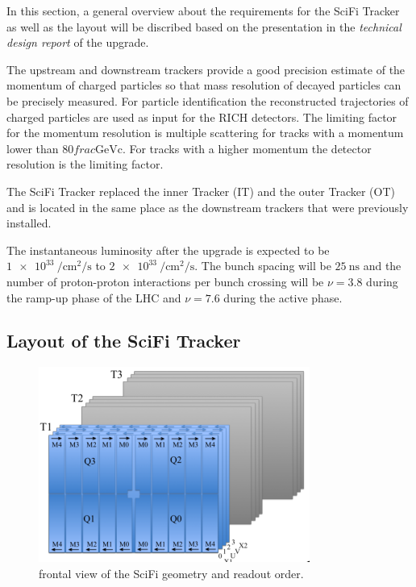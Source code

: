 In this section, a general overview about the requirements for the SciFi Tracker as well as the layout will be discribed based on the presentation in the \textit{technical design report}\cite{scifiInfo} of the upgrade.

The upstream and downstream trackers provide a good precision estimate of the momentum of charged particles so that mass resolution of decayed particles can be precisely measured.
For particle identification the reconstructed trajectories of charged particles are used as input for the RICH detectors.
The limiting factor for the momentum resolution is multiple scattering for tracks with a momentum lower than $\num{80}frac{\text{GeV}}{\text{c}}$. For tracks with a higher momentum the detector resolution is the limiting factor.

The SciFi Tracker replaced the inner Tracker (IT) and the outer Tracker (OT)
and is located in the same place as the downstream trackers that were previously installed.

The instantaneous luminosity after the upgrade is expected to be $\SI{1e33}{\per\centi\metre\squared\per\second}$ to $\SI{2e33}{\per\centi\metre\squared\per\second}$. The bunch spacing will be $\SI{25}{\nano\second}$ and the number of proton-proton interactions per bunch crossing will be $\nu = 3.8$ during the ramp-up phase of the LHC and $\nu = 7.6$ during the active phase.

\subsection{Layout of the SciFi Tracker}

\begin{figure}
  \centering
  \includegraphics{plots/SciFi_Tracker.png}
  \caption{frontal view of the SciFi geometry and readout order\cite{scifiupdate20210311}.}
  \label{fig:scifi}
\end{figure}

